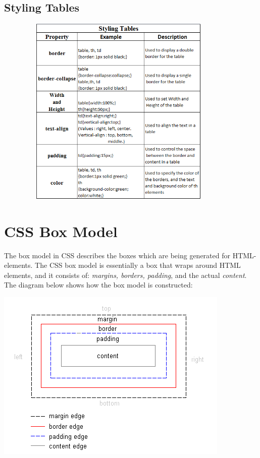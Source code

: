 \documentclass[11pt,a4paper]{article}
\begin{document}
\subsection*{Styling Tables}
\begin{center}
\includegraphics[width = 120mm, height = 92mm]{Tables.png}\\
\end{center}
\pagebreak
\section*{CSS Box Model}

The box model in CSS describes the boxes which are being generated for HTML-elements. The CSS box model is essentially a box that wraps around HTML elements, and it consists of: \emph{margins, borders, padding}, and the actual \emph{content}. The diagram below shows how the box model is constructed:

\includegraphics[scale=1.0]{Boxmodel}\\
\end{document}
